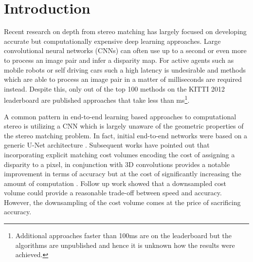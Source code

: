 \documentclass[final]{cvpr}
\newcommand{\algoname}{HITNet}
\begin{document}
\begin{abstract}
This paper presents \algoname, a novel neural network architecture for real-time stereo matching. Contrary to many recent neural network approaches that operate on a full cost volume and rely on 3D convolutions, our approach does not explicitly build a volume and instead relies on a fast multi-resolution initialization step, differentiable 2D geometric propagation and warping mechanisms to infer disparity hypotheses. To achieve a high level of accuracy, our network not only geometrically reasons about disparities but also infers slanted plane hypotheses allowing to more accurately perform geometric warping and upsampling operations.
Our architecture is inherently multi-resolution allowing the propagation of information across different levels. Multiple experiments prove the effectiveness of the proposed approach at a fraction of the computation required by state-of-the-art methods. At the time of writing, \algoname \ ranks 1\textsuperscript{st}-3\textsuperscript{rd} on all the metrics published on the ETH3D website for two view stereo, ranks 1\textsuperscript{st} on most of the metrics amongst all the end-to-end learning approaches on Middlebury-v3, ranks 1\textsuperscript{st} on the popular KITTI 2012 and 2015 benchmarks among the published methods faster than ms.
\end{abstract}  \section{Introduction}
Recent research on depth from stereo matching has largely focused on developing accurate but computationally expensive deep learning approaches. Large convolutional neural networks (CNNs) can often use up to a second or even more to process an image pair and infer a disparity map. For active agents such as mobile robots or self driving cars such a high latency is undesirable and methods which are able to process an image pair in a matter of milliseconds are required instead. Despite this, only  out of the top 100 methods on the KITTI 2012 leaderboard are published approaches that take less than ms\footnote{Additional approaches faster than 100ms are on the leaderboard but the algorithms are unpublished and hence it is unknown how the results were achieved.}.

A common pattern in end-to-end learning based approaches to computational stereo is utilizing a CNN which is largely unaware of the geometric properties of the stereo matching problem. In fact, initial end-to-end networks were based on a generic U-Net architecture \cite{mayer2016large}. Subsequent works have pointed out that incorporating explicit matching cost volumes encoding the cost of assigning a disparity to a pixel, in conjunction with 3D convolutions provides a notable improvement in terms of accuracy but at the cost of significantly increasing the amount of computation \cite{kendall2017end}. Follow up work \cite{stereonet} showed that a downsampled cost volume could provide a reasonable trade-off between speed and accuracy. However, the downsampling of the cost volume comes at the price of sacrificing accuracy.
\end{document}
